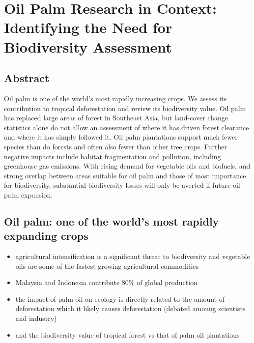 \section*{Oil Palm Research in Context: Identifying the Need for Biodiversity Assessment \citep{Turner2008}}

\subsection*{Abstract}
Oil palm is one of the world’s most rapidly increasing crops. We assess its contribution to tropical deforestation and review its biodiversity value. Oil palm has replaced large areas of forest in Southeast Asia, but land-cover change statistics alone do not allow an assessment of where it has driven forest clearance and where it has simply followed it. Oil palm plantations support much fewer species than do forests and often also fewer than other tree crops. Further negative impacts include habitat fragmentation and pollution, including greenhouse gas emissions. With rising demand for vegetable oils and biofuels, and strong overlap between areas suitable for oil palm and those of most importance for biodiversity, substantial biodiversity losses will only be averted if future oil palm expansion.

\subsection*{Oil palm: one of the world's most rapidly expanding crops}
\begin{itemize}
	\item agricultural intensification is a significant threat to biodiversity and vegetable oils are some of the fastest growing agricultural commodities
	\item Malaysia and Indonesia contribute 80\% of global production
	\item the impact of palm oil on ecology is directly related to the amount of deforestation which it likely causes deforestation (debated amoung scientists and industry)
	\item and the biodiversity value of tropical forest vs that of palm oil plantations
\end{itemize}


